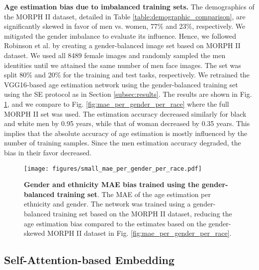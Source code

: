 \documentclass[10pt,journal]{IEEEtran}\usepackage{amsfonts}
\begin{document}
\textbf{Age estimation bias due to imbalanced training sets. }The demographics
of the MORPH II \cite{1613043} dataset, detailed in Table
\ref{table:demographic_comparison}, are significantly skewed in favor of men
vs. women, 77\% and 23\%, respectively. We mitigated the gender imbalance to
evaluate its influence. Hence, we followed Robinson et al.
\cite{robinson2021balancing,robinson2020face} by creating a gender-balanced
image set based on MORPH II dataset. We used all 8489 female images and
randomly sampled the men identities until we attained the same number of men
face images. The set was split 80\% and 20\% for the training and test tasks,
respectively. We retrained the VGG16-based age estimation network using the
gender-balanced training set using the SE protocol as in Section
\ref{subsec:results}. The results are shown in Fig.
\ref{fig:small_mae_per_gender_per_race}, and we compare to Fig.
\ref{fig:mae_per_gender_per_race} where the full MORPH II set was used. The
estimation accuracy decreased similarly for black and white men by
0.95 years, while that of woman decreased by 0.35
years. This implies that the absolute accuracy of age estimation is mostly
influenced by the number of training samples. Since the men estimation
accuracy degraded, the bias in their favor decreased.\begin{figure}[ptb]
\centering\texttt{[image: figures/small\_mae\_per\_gender\_per\_race.pdf]}\caption{\textbf{Gender
and ethnicity MAE bias trained using the gender-balanced training set}. The
MAE of the age estimation per ethnicity and gender. The network was trained
using a gender-balanced training set based on the MORPH II dataset, reducing
the age estimation bias compared to the estimates based on the gender-skewed
MORPH II dataset in Fig. \ref{fig:mae_per_gender_per_race}.}\label{fig:small_mae_per_gender_per_race}\end{figure}

\subsection{Self-Attention-based Embedding}
\end{document}
